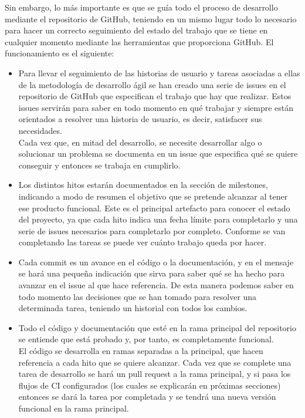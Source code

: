 Sin embargo, lo más importante es que se guía todo el proceso de desarrollo
mediante el repositorio de GitHub, teniendo en un mismo lugar todo lo necesario
para hacer un correcto seguimiento del estado del trabajo que se tiene en
cualquier momento mediante las herramientas que proporciona GitHub. El
funcionamiento es el siguiente:
\begin{itemize}
    \item Para llevar el seguimiento de las historias de usuario y tareas
    asociadas a ellas de la metodología de desarrollo ágil se han creado una
    serie de issues en el repositorio de GitHub que especifican el trabajo que
    hay que realizar. Estos issues servirán para saber en todo momento en qué
    trabajar y siempre están orientados a resolver una historia de usuario, es
    decir, satisfacer sus necesidades.\\
    Cada vez que, en mitad del desarrollo, se necesite desarrollar algo o
    solucionar un problema se documenta en un issue que especifica qué se quiere
    conseguir y entonces se trabaja en cumplirlo.
    \item Los distintos hitos estarán documentados en la sección de milestones,
    indicando a modo de resumen el objetivo que se pretende alcanzar al tener
    ese producto funcional. Este es el principal artefacto para conocer el
    estado del proyecto, ya que cada hito indica una fecha límite para
    completarlo y una serie de issues necesarios para completarlo por completo.
    Conforme se van completando las tareas se puede ver cuánto trabajo queda por
    hacer.
    \item Cada commit es un avance en el código o la documentación, y en el
    mensaje se hará una pequeña indicación que sirva para saber qué se ha hecho
    para avanzar en el issue al que hace referencia. De esta manera podemos
    saber en todo momento las decisiones que se han tomado para resolver una
    determinada tarea, teniendo un historial con todos los cambios.
    \item Todo el código y documentación que esté en la rama principal del
    repositorio se entiende que está probado y, por tanto, es completamente
    funcional. \\
    El código se desarrolla en ramas separadas a la principal, que hacen
    referencia a cada hito que se quiere alcanzar. Cada vez que se complete una
    tarea de desarrollo se hará un pull request a la rama principal, y si pasa
    los flujos de CI configurados (los cuales se explicarán en próximas
    secciones) entonces se dará la tarea por completada y se tendrá una nueva
    versión funcional en la rama principal. 
\end{itemize}

